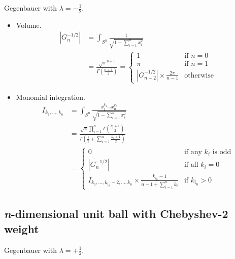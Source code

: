 \documentclass[draft]{scrartcl}
\begin{document}
Gegenbauer with $\lambda=-\frac{1}{2}.$

\begin{itemize}
  \item Volume.
    \begin{align}\nonumber
    |G_n^{-1/2}|
      &= \int_{S^n} \frac{1}{\sqrt{1 - \sum_{i=1}^n x_i^2}}\\
      &= \frac{
        \sqrt{\pi}^{n+1}
      }{
        \Gamma\left(\frac{n+1}{2}\right)
      }
      =\begin{cases}
        1&\text{if $n=0$}\\
        \pi&\text{if $n=1$}\\
        |G_{n-2}^{-1/2}| \times \frac{2\pi}{n-1}&\text{otherwise}
      \end{cases}
    \end{align}

  \item Monomial integration.
    \begin{align}\nonumber
    I_{k_1,\dots,k_n}
      &= \int_{S^n} \frac{x_1^{k_1}\cdots x_n^{k_n}}{\sqrt{1 - \sum_{i=1}^n x_i^2}}\\
      &= \frac{
        \sqrt{\pi} \prod_{i=1}^n \Gamma\left(\frac{k_i+1}{2}\right)
      }{
        \Gamma\left(\frac{1}{2} + \sum_{i=1}^n \frac{k_i+1}{2}\right)
      }\\
      &= \begin{cases}
        0&\text{if any $k_i$ is odd}\\
        |G_n^{-1/2}|&\text{if all $k_i=0$}\\
        I_{k_1,\dots,k_{i_0}-2,\dots,k_n} \times \frac{k_{i_0}-1}{n-1 + \sum_{i=1}^n k_i}&\text{if $k_{i_0} > 0$}
      \end{cases}
    \end{align}
\end{itemize}


\subsection*{\textit{n}-dimensional unit ball with Chebyshev-2 weight}
Gegenbauer with $\lambda = +\frac{1}{2}.$
\end{document}
